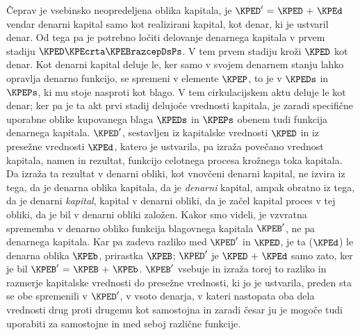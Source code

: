 \documentclass[kapital_02.tex]{subfiles}
\begin{document}
Čeprav je vsebinsko neopredeljena oblika kapitala, je \(\KPED' \textrm{ = } \KPED \textrm{ + } \KPEd\) vendar denarni kapital samo kot realizirani kapital, kot denar, ki je ustvaril denar. Od tega pa je potrebno ločiti delovanje denarnega kapitala v prvem stadiju \(\KPED\KPEcrta\KPEBrazcepDsPs\). V tem prvem stadiju kroži \(\KPED\) kot denar. Kot denarni kapital deluje le, ker samo v svojem denarnem stanju lahko opravlja denarno funkcijo, se spremeni v elemente \(\KPEP\), to je v \(\KPEDs\) in \(\KPEPs\), ki mu stoje nasproti kot blago. V tem cirkulacijskem aktu deluje le kot denar; ker pa je ta akt prvi stadij delujoče vrednosti kapitala, je zaradi specifične uporabne oblike kupovanega blaga \(\KPEDs\) in \(\KPEPs\) obenem tudi funkcija denarnega kapitala. \(\KPED'\), sestavljen iz kapitalske vrednosti \(\KPED\) in iz presežne vrednosti \(\KPEd\), katero je ustvarila, pa izraža povečano vrednost kapitala, namen in rezultat, funkcijo celotnega procesa krožnega toka kapitala. Da izraža ta rezultat v denarni obliki, kot vnovčeni denarni kapital, ne izvira iz tega, da je denarna oblika kapitala, da je \emph{denarni} kapital, \KPEstran ampak obratno iz tega, da je denarni \emph{kapital}, kapital v denarni obliki, da je začel kapital proces v tej obliki, da je bil v denarni obliki založen. Kakor smo videli, je vzvratna sprememba v denarno obliko funkcija blagovnega kapitala \(\KPEB'\), ne pa denarnega kapitala. Kar pa zadeva razliko med \(\KPED'\) in \(\KPED\), je ta (\(\KPEd\)) le denarna oblika \(\KPEb\), prirastka \(\KPEB\); \(\KPED'\) je \(\KPED \textrm{ + } \KPEd\) samo zato, ker je bil \(\KPEB' \textrm{ = } \KPEB \textrm{ + } \KPEb\). \(\KPEB'\) vsebuje in izraža torej to razliko in razmerje kapitalske vrednosti do presežne vrednosti, ki jo je ustvarila, preden sta se obe spremenili v \(\KPED'\), v vsoto denarja, v kateri nastopata oba dela vrednosti drug proti drugemu kot samostojna in zaradi česar ju je mogoče tudi uporabiti za samostojne in med seboj različne funkcije.
\end{document}
